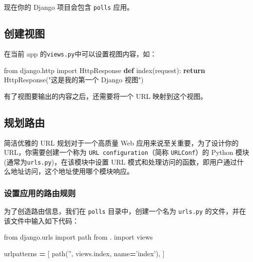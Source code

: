 \documentclass[]{ctexbook}
\newenvironment{Shaded}{\begin{snugshade}}{\end{snugshade}}
\newcommand{\ControlFlowTok}[1]{\textcolor[rgb]{0.13,0.29,0.53}{\textbf{#1}}}
\newcommand{\ImportTok}[1]{#1}
\newcommand{\KeywordTok}[1]{\textcolor[rgb]{0.13,0.29,0.53}{\textbf{#1}}}
\newcommand{\NormalTok}[1]{#1}
\newcommand{\OperatorTok}[1]{\textcolor[rgb]{0.81,0.36,0.00}{\textbf{#1}}}
\newcommand{\StringTok}[1]{\textcolor[rgb]{0.31,0.60,0.02}{#1}}
\begin{document}
现在你的 Django 项目会包含 \texttt{polls} 应用。

\hypertarget{ux521bux5efaux89c6ux56fe}{%
\subsection{创建视图}\label{ux521bux5efaux89c6ux56fe}}

在当前 app 的\texttt{views.py}中可以设置视图内容，如：

\begin{Shaded}
\begin{Highlighting}[]
\ImportTok{from}\NormalTok{ django.http }\ImportTok{import}\NormalTok{ HttpResponse}
\KeywordTok{def}\NormalTok{ index(request):}
    \ControlFlowTok{return}\NormalTok{ HttpResponse(}\StringTok{"这是我的第一个 Django 视图"}\NormalTok{)}
\end{Highlighting}
\end{Shaded}

有了视图要输出的内容之后，还需要将一个 URL 映射到这个视图。

\hypertarget{ux89c4ux5212ux8defux7531}{%
\subsection{规划路由}\label{ux89c4ux5212ux8defux7531}}

简洁优雅的 URL 规划对于一个高质量 Web 应用来说至关重要，为了设计你的 URL，你需要创建一个称为 \texttt{URL\ configuration}（简称 \texttt{URLConf}）的 Python 模块(通常为\texttt{urls.py})，在该模块中设置 URL 模式和处理访问的函数，即用户通过什么地址访问，这个地址使用哪个模块响应。

\hypertarget{ux8bbeux7f6eux5e94ux7528ux7684ux8defux7531ux89c4ux5219}{%
\subsubsection{设置应用的路由规则}\label{ux8bbeux7f6eux5e94ux7528ux7684ux8defux7531ux89c4ux5219}}

为了创造路由信息，我们在 \texttt{polls} 目录中，创建一个名为 \texttt{urls.py} 的文件，并在该文件中输入如下代码：

\begin{Shaded}
\begin{Highlighting}[]
\ImportTok{from}\NormalTok{ django.urls }\ImportTok{import}\NormalTok{ path}
\ImportTok{from}\NormalTok{ . }\ImportTok{import}\NormalTok{ views}

\NormalTok{urlpatterns }\OperatorTok{=}\NormalTok{ [}
\NormalTok{    path(}\StringTok{''}\NormalTok{, views.index, name}\OperatorTok{=}\StringTok{'index'}\NormalTok{),}
\NormalTok{]}
\end{Highlighting}
\end{Shaded}
\end{document}
